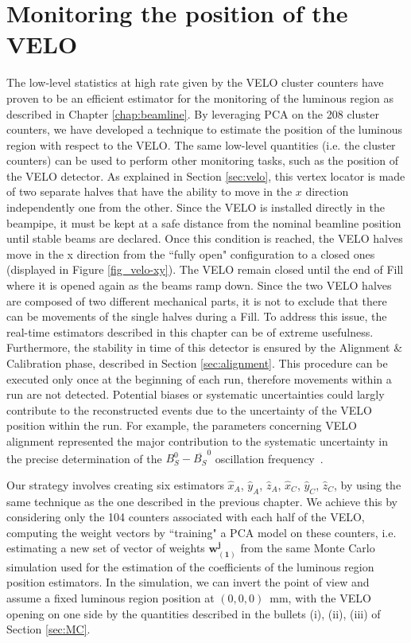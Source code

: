 \chapter{Monitoring the position of the VELO}
\label{chap:pos_VELO}
The low-level statistics at high rate given by the VELO cluster counters have proven to be an efficient estimator for the monitoring of the luminous region as described in Chapter \ref{chap:beamline}. By leveraging PCA on the 208 cluster counters, we have developed a technique to estimate the position of the luminous region with respect to the VELO. The same low-level quantities (i.e. the cluster counters) can be used to perform other monitoring tasks, such as the position of the VELO detector. As explained in Section \ref{sec:velo}, this vertex locator is made of two separate halves that have the ability to move in the $x$ direction  independently one from the other. Since the VELO is installed directly in the beampipe, it must be kept at a safe distance from the nominal beamline position until stable beams are declared. Once this condition is reached, the VELO halves move in the x direction from the ``fully open" configuration to a closed ones (displayed in Figure \ref{fig_velo-xy}). The VELO remain closed until the end of Fill where it is opened again as the beams ramp down. Since the two VELO halves are composed of two different mechanical parts, it is not to exclude that there can be movements of the single halves during a Fill. To address this issue, the real-time estimators described in this chapter can be of extreme usefulness. 
Furthermore, the stability in time of this detector is ensured by the Alignment \& Calibration phase, described in Section \ref{sec:alignment}.  This procedure can be executed only once at the beginning of each run, therefore movements within a run are not detected. Potential biases or systematic uncertainties could largly contribute to the reconstructed events due to the uncertainty of the VELO position within the run. For example, the parameters concerning VELO alignment represented the major contribution to the systematic uncertainty in the precise determination of the $B_S^0-\overline{B_S} ^0$ oscillation frequency~\cite{b0b0soscillation}.

Our strategy involves creating six estimators $\hat{x}_A$, $\hat{y}_A$, $\hat{z}_A$, $\hat{x}_C$, $\hat{y}_C$, $\hat{z}_C$, by using the same technique as the one described in the previous chapter. 
We achieve this by considering only the 104 counters associated with each half of the VELO, computing the weight vectors by ``training" a PCA model on these counters, i.e. estimating a new set of vector of weights $\mathbf{w^j_{(1)}}$ from the same Monte Carlo simulation used for the estimation of the coefficients of the luminous region position estimators.
In the simulation, we can invert the point of view and assume a fixed luminous region position at $(0,0,0)$~mm, with the VELO opening on one side by the quantities described in the bullets (i), (ii), (iii) of Section \ref{sec:MC}. 


